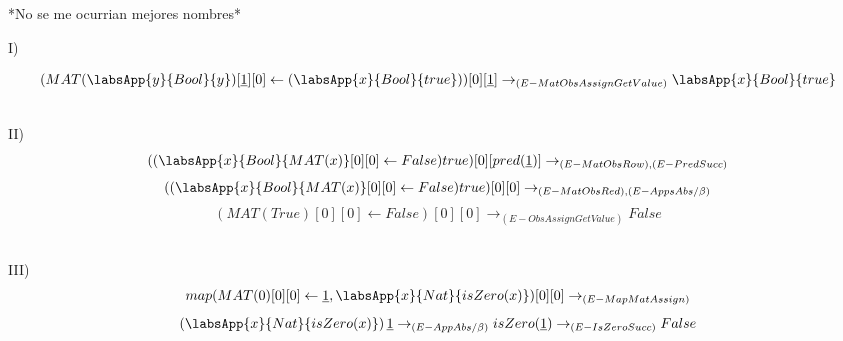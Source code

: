 \documentclass[leqno, 12pt, twoside, letterpaper]{book}
\begin{document}
\begin{center}
\end{center}


*No se me ocurrian mejores nombres*

\begin{center}
\end{center}


\begin{center}
\end{center}

\begin{center}
\end{center}

\begin{center}
\end{center}




 I) 

$$
 (MAT(\labsApp{y}{Bool}{y})[\underline{1}][0] \leftarrow (\labsApp{x}{Bool}{true}))[0][\underline{1}] \rightarrow_{(E - MatObsAssignGetValue)} 
  \labsApp{x}{Bool}{true} 
$$

\hfill\\

\noindent II) $$ ((\labsApp{x}{Bool}{MAT(x)}[0][0] \leftarrow False) true)[0][pred(\underline{1})] \rightarrow_{(E - MatObsRow), (E - PredSucc)}$$
$$ ((\labsApp{x}{Bool}{MAT(x)}[0][0] \leftarrow False) true)[0][0] \rightarrow_{ (E - MatObsRed), (E - AppsAbs / \beta)} $$
$$ (MAT(True)[0][0] \leftarrow False)[0][0] \rightarrow_{ (E - ObsAssignGetValue)} False $$

\hfill\\

\noindent III) $$ map(MAT(0)[0][0] \leftarrow \underline{1}, \labsApp{x}{Nat}{isZero(x)})[0][0] \rightarrow_{(E - MapMatAssign)}$$
$$ (\labsApp{x}{Nat}{isZero(x)}) \, \underline{1} \rightarrow_{(E - AppAbs / \beta)} isZero(\underline{1}) \rightarrow_{(E - IsZeroSucc)} False $$
\end{document}
